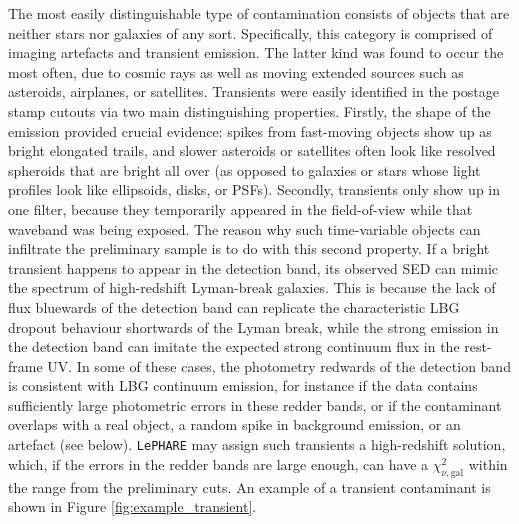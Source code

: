 The most easily distinguishable type of contamination consists of objects that are neither stars nor galaxies of any sort. Specifically, this category is comprised of imaging artefacts and transient emission. The latter kind was found to occur the most often, due to cosmic rays as well as moving extended sources such as asteroids, airplanes, or satellites. Transients were easily identified in the postage stamp cutouts via two main distinguishing properties. Firstly, the shape of the emission provided crucial evidence: spikes from fast-moving objects show up as bright elongated trails, and slower asteroids or satellites often look like resolved spheroids that are bright all over (as opposed to galaxies or stars whose light profiles look like ellipsoids, disks, or PSFs). Secondly, transients only show up in one filter, because they temporarily appeared in the field-of-view while that waveband was being exposed. The reason why such time-variable objects can infiltrate the preliminary sample is to do with this second property. If a bright transient happens to appear in the detection band, its observed SED can mimic the spectrum of high-redshift Lyman-break galaxies.  This is because the lack of flux bluewards of the detection band can replicate the characteristic LBG dropout behaviour shortwards of the Lyman break, while the strong emission in the detection band can imitate the expected strong continuum flux in the rest-frame UV. In some of these cases, the  photometry redwards of the detection band is consistent with LBG continuum emission, for instance if the data contains sufficiently large photometric errors in these redder bands, or if the contaminant overlaps with a real object, a random spike in background emission, or an artefact (see below). \texttt{LePHARE} may assign such transients a high-redshift solution, which, if the errors in the redder bands are large enough, can have a $\chi^2_{\nu,\mathrm{gal}}$ within the range from the preliminary cuts. An example of a transient contaminant is shown in Figure \ref{fig:example_transient}. \par 


